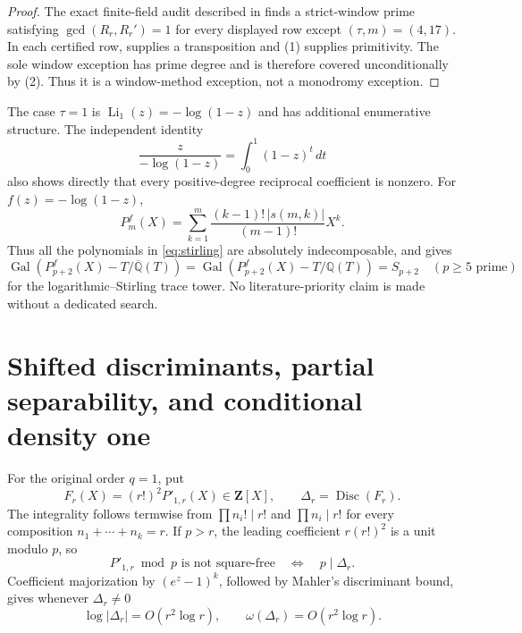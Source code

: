 \documentclass[11pt]{article}
\theoremstyle{keio}
\theoremstyle{definition}
\theoremstyle{remark}
\newcommand{\Q}{\mathbb Q}
\newcommand{\Gal}{\operatorname{Gal}}
\begin{document}
\begin{proof}
The exact finite-field audit described in
 finds a strict-window prime satisfying
$\gcd(R_r,R_r')=1$ for every displayed row except
$(\tau,m)=(4,17)$.  In each certified row,  supplies a
transposition and (1) supplies primitivity.  The sole
window exception has prime degree and is therefore covered unconditionally
by (2).  Thus it is a window-method exception, not a
monodromy exception.
\end{proof}

The case $\tau=1$ is $\operatorname{Li}_1(z)=-\log(1-z)$ and has additional
enumerative structure. The independent identity
\[
\frac z{-\log(1-z)}=\int_0^1(1-z)^t\,dt
\]
also shows directly that every positive-degree reciprocal coefficient is
nonzero. For
$f(z)=-\log(1-z)$,
\begin{equation}
P_m^f(X)=\sum_{k=1}^m
\frac{(k-1)!\,|s(m,k)|}{(m-1)!}X^k.
\label{eq:stirling}
\end{equation}
Thus all the polynomials in \eqref{eq:stirling} are absolutely
indecomposable, and  gives
\begin{equation}
\boxed{
\Gal(P_{p+2}^f(X)-T/\overline{\Q}(T))
=\Gal(P_{p+2}^f(X)-T/\Q(T))=S_{p+2}
\quad(p\ge5\text{ prime})}
\label{eq:stirling-mon}
\end{equation}
for the logarithmic--Stirling trace tower. No literature-priority claim is
made without a dedicated search.

\section{Shifted discriminants, partial separability, and conditional density one}

For the original order $q=1$, put
\begin{equation}
F_r(X)=(r!)^2P'_{1,r}(X)\in\mathbf Z[X],
\qquad
\Delta_r=\operatorname{Disc}(F_r).
\label{eq:Delta}
\end{equation}
The integrality follows termwise from $\prod n_i!\mid r!$ and
$\prod n_i\mid r!$ for every composition $n_1+\cdots+n_k=r$. If $p>r$,
the leading coefficient $r(r!)^2$ is a unit modulo $p$, so
\begin{equation}
\boxed{
P'_{1,r}\bmod p\text{ is not square-free}
\quad\Longleftrightarrow\quad p\mid\Delta_r.}
\label{eq:Delta-equivalence}
\end{equation}
Coefficient majorization by $(e^z-1)^k$, followed by Mahler's
discriminant bound, gives whenever $\Delta_r\ne0$
\begin{equation}
\log|\Delta_r|=O(r^2\log r),
\qquad
\omega(\Delta_r)=O(r^2\log r).
\label{eq:Delta-bound}
\end{equation}
\end{document}
